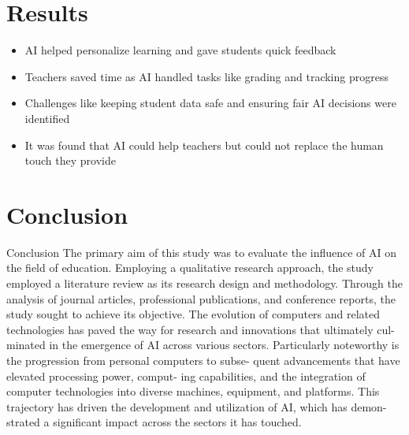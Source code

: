 \documentclass[serif, aspectratio=169]{beamer}
\begin{document}
\section{Results}
\begin{frame}
    \begin{itemize}
        \item AI helped personalize learning and gave students quick feedback
        \item Teachers saved time as AI handled tasks like grading and tracking progress
        \item Challenges like keeping student data safe and ensuring fair AI decisions were identified
        \item It was found that AI could help teachers but could not replace the human touch they provide
    \end{itemize}
\end{frame}
\section{Conclusion}
\begin{frame}{Conclusion}
    The primary aim of this study was to evaluate the influence of AI on
the field of education. Employing a qualitative research approach,
the study employed a literature review as its research design and
methodology. Through the analysis of journal articles, professional
publications, and conference reports, the study sought to achieve
its objective. The evolution of computers and related technologies
has paved the way for research and innovations that ultimately cul-
minated in the emergence of AI across various sectors. Particularly
noteworthy is the progression from personal computers to subse-
quent advancements that have elevated processing power, comput-
ing capabilities, and the integration of computer technologies into
diverse machines, equipment, and platforms. This trajectory has
driven the development and utilization of AI, which has demon-
strated a significant impact across the sectors it has touched.
\end{frame}

\end{document}
